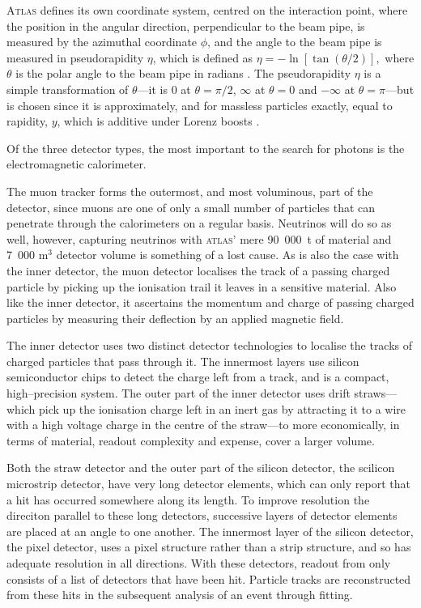 \textsc{Atlas} defines its own coordinate system, centred on the interaction point, where the position in the angular direction, perpendicular to the beam pipe, is measured by the azimuthal coordinate $\phi$, and the angle to the beam pipe is measured in pseudorapidity $\eta$, which is defined as
\(\eta=-\ln[\tan(\theta/2)],\)
where $\theta$ is the polar angle to the beam pipe in radians \cite{green:eta}. The pseudorapidity $\eta$ is a simple transformation of $\theta$---it is 0 at $\theta=\pi/2$, $\infty$ at $\theta=0$ and $-\infty$ at $\theta=\pi$---but is chosen since it is approximately, and for massless particles exactly, equal to rapidity, $y$, which is additive under Lorenz boosts \cite{green:y}.

Of the three detector types, the most important to the search for photons is the electromagnetic calorimeter.

The muon tracker forms the outermost, and most voluminous, part of the detector, since muons are one of only a small number of particles that can penetrate through the calorimeters on a regular basis. Neutrinos will do so as well, however, capturing neutrinos with \textsc{atlas}' mere 90~000~t of material and 7~000 m$^3$ detector volume \cite{atlasweb} is something of a lost cause. As is also the case with the inner detector, the muon detector localises the track of a passing charged particle by picking up the ionisation trail it leaves in a sensitive material. Also like the inner detector, it ascertains the momentum and charge of passing charged particles by measuring their deflection by an applied magnetic field.

The inner detector uses two distinct detector technologies to localise the tracks of charged particles that pass through it. The innermost layers use silicon semiconductor chips to detect the charge left from a track, and is a compact, high--precision system. The outer part of the inner detector uses drift straws---which pick up the ionisation charge left in an inert gas by attracting it to a wire with a high voltage charge in the centre of the straw---to more economically, in terms of material, readout complexity and expense, cover a larger volume.

Both the straw detector and the outer part of the silicon detector, the scilicon microstrip detector, have very long detector elements, which can only report that a hit has occurred somewhere along its length. To improve resolution the direciton parallel to these long detectors, successive layers of detector elements are placed at an angle to one another. The innermost layer of the silicon detector, the pixel detector, uses a pixel structure rather than a strip structure, and so has adequate resolution in all directions. With these detectors, readout from \atlas{} only consists of a list of detectors that have been hit. Particle tracks are reconstructed from these hits in the subsequent analysis of an event through fitting.

